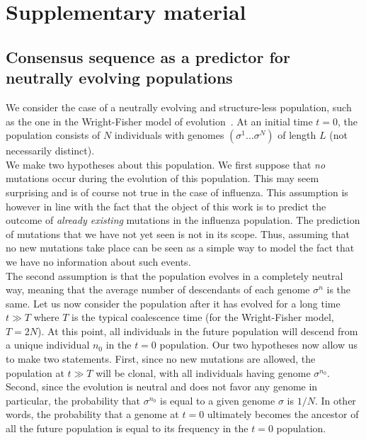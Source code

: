 \documentclass[reprint,amsmath,amssymb,superscriptaddress,showpacs,rmp]{revtex4-1}
\begin{document}
\section*{Supplementary material} %
\label{sec:supplementary_material}

\subsection{Consensus sequence as a predictor for neutrally evolving populations} %
\label{sub:consensus_sequence_as_a_predictor}

	We consider the case of a neutrally evolving and structure-less population, such as the one in the Wright-Fisher model of evolution~\cite{10.1080/10635150500354860}. At an initial time $t=0$, the population consists of $N$ individuals with genomes $(\sigma^1\ldots\sigma^N)$ of length $L$ (not necessarily distinct). \\
	We make two hypotheses about this population. We first suppose that \emph{no} mutations occur during the evolution of this population. This may seem surprising and is of course not true in the case of influenza. This assumption is however in line with the fact that the object of this work is to predict the outcome of \emph{already existing} mutations in the influenza population. The prediction of mutations that we have not yet seen is not in its scope. Thus, assuming that no new mutations take place can be seen as a simple way to model the fact that we have no information about such events. \\
	The second assumption is that the population evolves in a completely neutral way, meaning that the average number of descendants of each genome $\sigma^n$ is the same. Let us now consider the population after it has evolved for a long time $t\gg T$ where $T$ is the typical coalescence time (for the Wright-Fisher model, $T=2N$). At this point, all individuals in the future population will descend from a unique individual $n_0$ in the $t=0$ population. Our two hypotheses now allow us to make two statements. First, since no new mutations are allowed, the population at $t\gg T$ will be clonal, with all individuals having genome $\sigma^{n_0}$. Second, since the evolution is neutral and does not favor any genome in particular, the probability that $\sigma^{n_0}$ is equal to a given genome $\sigma$ is $1/N$. In other words, the probability that a genome at $t=0$ ultimately becomes the ancestor of all the future population is equal to its frequency in the $t=0$ population. \\
 
\end{document}
